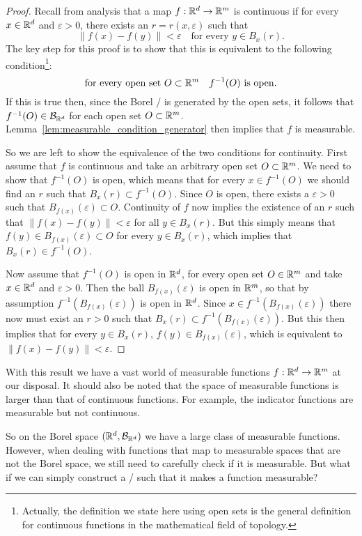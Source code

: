 \begin{proof}
Recall from analysis that a map $f : \mathbb R^d \to \mathbb R^m$ is continuous if for every $x \in \mathbb R^d$ and $\varepsilon > 0$, there exists an $r = r(x,\varepsilon)$ such that 
\[
	\|f(x) - f(y)\| < \varepsilon \quad \text{for every } y \in B_x(r).
\]
The key step for this proof is to show that this is equivalent to the following condition\footnote{Actually, the definition we state here using open sets is the general definition for continuous functions in the mathematical field of topology.}:
\[
	\text{for every open set } O \subset \mathbb R^m \quad f^{-1}(O) \text{ is open}.
\]
If this is true then, since the Borel \sigalg/ is generated by the open sets, it follows that $f^{-1}(O) \in \mathcal B_{\mathbb R^d}$ for each open set $O \subset \mathbb R^m$. Lemma~\ref{lem:measurable_condition_generator} then implies that $f$ is measurable.

So we are left to show the equivalence of the two conditions for continuity. First assume that $f$ is continuous and take an arbitrary open set $O \subset \mathbb R^m$. We need to show that $f^{-1}(O)$ is open, which means that for every $x \in f^{-1}(O)$ we should find an $r$ such that $B_x(r) \subset f^{-1}(O)$. Since $O$ is open, there exists a $\varepsilon > 0$ such that $B_{f(x)}(\varepsilon) \subset O$. Continuity of $f$ now implies the existence of an $r$ such that $\|f(x) - f(y)\| < \varepsilon$ for all $y \in B_x(r)$. But this simply means that $f(y) \in B_{f(x)}(\varepsilon) \subset O$ for every $y \in B_x(r)$, which implies that $B_x(r) \in f^{-1}(O)$.

Now assume that $f^{-1}(O)$ is open in $\mathbb R^d$, for every open set $O \in \mathbb R^m$ and take $x \in \mathbb R^d$ and $\varepsilon > 0$. Then the ball $B_{f(x)}(\varepsilon)$ is open in $\mathbb R^m$, so that by assumption $f^{-1}(B_{f(x)}(\varepsilon))$ is open in $\mathbb R^d$. Since $x \in f^{-1}(B_{f(x)}(\varepsilon))$ there now must exist an $r > 0$ such that $B_x(r) \subset f^{-1}(B_{f(x)}(\varepsilon))$. But this then implies that for every $y \in B_x(r)$, $f(y) \in B_{f(x)}(\varepsilon)$, which is equivalent to $\|f(x) - f(y)\| < \varepsilon$.
\end{proof}

With this result we have a vast world of measurable functions $f : \mathbb R^d \to \mathbb R^m$ at our disposal. It should also be noted that the space of measurable functions is larger than that of continuous functions. For example, the indicator functions are measurable but not continuous.

So on the Borel space $(\mathbb R^d, \mathcal B_{\mathbb R^d})$ we have a large class of measurable functions. However, when dealing with functions that map to measurable spaces that are not the Borel space, we still need to carefully check if it is measurable. But what if we can simply construct a \sigalg/ such that it makes a function measurable?

